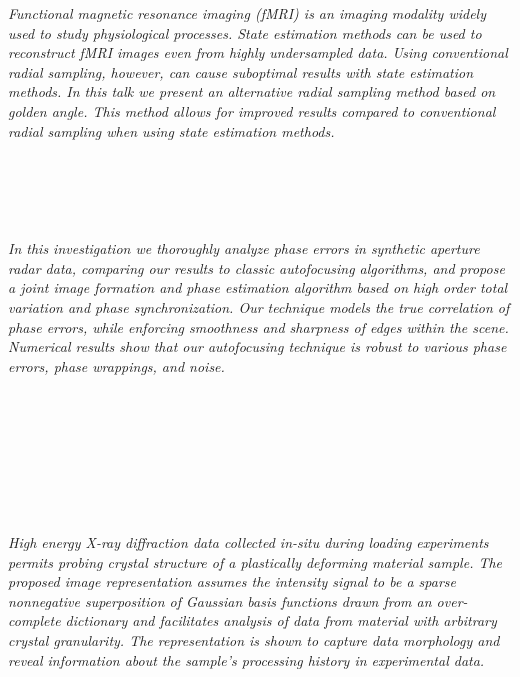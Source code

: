   \begin{multicols}{2}
      \textit{Functional magnetic resonance imaging (fMRI) is an imaging modality widely used to study physiological processes. State estimation methods can be used to reconstruct fMRI images even from highly undersampled data. Using conventional radial sampling, however, can cause suboptimal results with state estimation methods. In this talk we present an alternative radial sampling method based on golden angle. This method allows for improved results compared to conventional radial sampling when using state estimation methods. }\\
\\ 
        \\
        \\\\
\\
      \textit{In this investigation we thoroughly analyze phase errors in synthetic aperture radar data, comparing our results to classic autofocusing algorithms, and propose a joint image formation and phase estimation algorithm based on high order total variation and phase synchronization. Our technique models the true correlation of phase errors, while enforcing smoothness and sharpness of edges within the scene. Numerical results show that our autofocusing technique is robust to various phase errors, phase wrappings, and noise. }\\
\\ 
        \\
        \\\\
        \\
        \\\\
\\
      \textit{High energy X-ray diffraction data collected in-situ during loading experiments permits probing crystal structure of a plastically deforming material sample. The proposed image representation assumes the intensity signal to be a sparse nonnegative superposition of Gaussian basis functions drawn from an over-complete dictionary and facilitates analysis of data from material with arbitrary crystal granularity. The representation is shown to capture data morphology and reveal information about the sample’s processing history in experimental data.}\\

\end{multicols}
